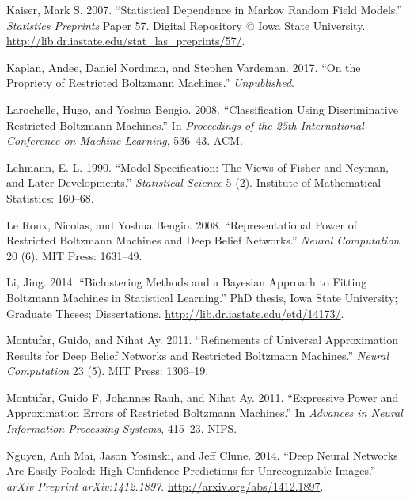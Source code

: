 \documentclass[]{article}
\theoremstyle{definition}
\begin{document}
\leavevmode\hypertarget{ref-kaiser2007statistical}{}%
Kaiser, Mark S. 2007. ``Statistical Dependence in Markov Random Field
Models.'' \emph{Statistics Preprints} Paper 57. Digital Repository @
Iowa State University.
\url{http://lib.dr.iastate.edu/stat_las_preprints/57/}.

\leavevmode\hypertarget{ref-kaplan2016propriety}{}%
Kaplan, Andee, Daniel Nordman, and Stephen Vardeman. 2017. ``On the
Propriety of Restricted Boltzmann Machines.'' \emph{Unpublished}.

\leavevmode\hypertarget{ref-larochelle2008classification}{}%
Larochelle, Hugo, and Yoshua Bengio. 2008. ``Classification Using
Discriminative Restricted Boltzmann Machines.'' In \emph{Proceedings of
the 25th International Conference on Machine Learning}, 536--43. ACM.

\leavevmode\hypertarget{ref-lehmann1990model}{}%
Lehmann, E. L. 1990. ``Model Specification: The Views of Fisher and
Neyman, and Later Developments.'' \emph{Statistical Science} 5 (2).
Institute of Mathematical Statistics: 160--68.

\leavevmode\hypertarget{ref-le2008representational}{}%
Le Roux, Nicolas, and Yoshua Bengio. 2008. ``Representational Power of
Restricted Boltzmann Machines and Deep Belief Networks.'' \emph{Neural
Computation} 20 (6). MIT Press: 1631--49.

\leavevmode\hypertarget{ref-li2014biclustering}{}%
Li, Jing. 2014. ``Biclustering Methods and a Bayesian Approach to
Fitting Boltzmann Machines in Statistical Learning.'' PhD thesis, Iowa
State University; Graduate Theses; Dissertations.
\url{http://lib.dr.iastate.edu/etd/14173/}.

\leavevmode\hypertarget{ref-montufar2011refinements}{}%
Montufar, Guido, and Nihat Ay. 2011. ``Refinements of Universal
Approximation Results for Deep Belief Networks and Restricted Boltzmann
Machines.'' \emph{Neural Computation} 23 (5). MIT Press: 1306--19.

\leavevmode\hypertarget{ref-montufar2011expressive}{}%
Montúfar, Guido F, Johannes Rauh, and Nihat Ay. 2011. ``Expressive Power
and Approximation Errors of Restricted Boltzmann Machines.'' In
\emph{Advances in Neural Information Processing Systems}, 415--23. NIPS.

\leavevmode\hypertarget{ref-nguyen2014deep}{}%
Nguyen, Anh Mai, Jason Yosinski, and Jeff Clune. 2014. ``Deep Neural
Networks Are Easily Fooled: High Confidence Predictions for
Unrecognizable Images.'' \emph{arXiv Preprint arXiv:1412.1897}.
\url{http://arxiv.org/abs/1412.1897}.
\end{document}
